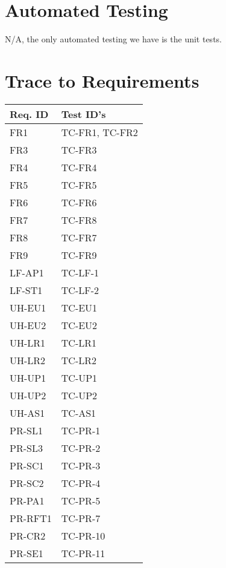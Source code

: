 \documentclass[12pt, titlepage]{article}
\begin{document}

\section{Automated Testing}
N/A, the only automated testing we have is the unit tests.

\section{Trace to Requirements}

\begin{longtable}{|l|l|}
  \hline
  \textbf{Req. ID} & \textbf{Test ID's} \\
  \hline
  FR1 & TC-FR1, TC-FR2\\ \hline
  FR3 & TC-FR3\\ \hline
  FR4 & TC-FR4\\ \hline
  FR5 & TC-FR5\\ \hline
  FR6 & TC-FR6\\ \hline
  FR7 & TC-FR8\\ \hline
  FR8 & TC-FR7\\ \hline
  FR9 & TC-FR9\\ \hline
  LF-AP1 & TC-LF-1 \\ \hline
  LF-ST1 & TC-LF-2 \\ \hline
  UH-EU1 & TC-EU1\\ \hline
  UH-EU2 & TC-EU2\\ \hline
  UH-LR1 & TC-LR1\\ \hline
  UH-LR2 & TC-LR2\\ \hline
  UH-UP1 & TC-UP1\\ \hline
  UH-UP2 & TC-UP2\\ \hline
  UH-AS1 & TC-AS1\\ \hline
  PR-SL1 & TC-PR-1\\ \hline
  PR-SL3 & TC-PR-2\\ \hline
  PR-SC1 & TC-PR-3\\ \hline
  PR-SC2 & TC-PR-4\\ \hline
  PR-PA1 & TC-PR-5\\ \hline
  PR-RFT1 & TC-PR-7\\ \hline
  PR-CR2 & TC-PR-10\\ \hline
  PR-SE1 & TC-PR-11\\ \hline

\end{longtable}
\end{document}
